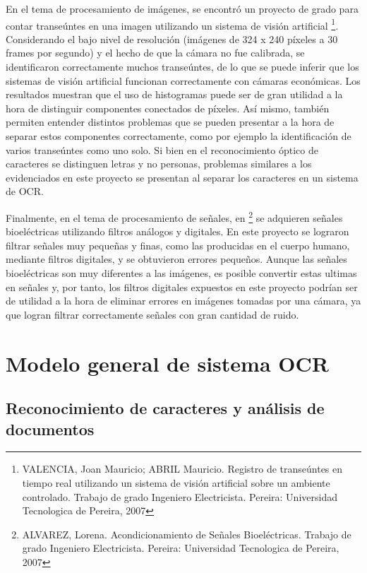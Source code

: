\documentclass[a4paper, 11pt, oneside]{report}
\begin{document}
En el tema de procesamiento de imágenes, se encontró un proyecto de grado para contar transeúntes en una imagen utilizando un sistema de visión artificial \footnote{VALENCIA, Joan Mauricio; ABRIL Mauricio. Registro de transeúntes en tiempo real utilizando un sistema de visión artificial sobre un ambiente controlado. Trabajo de grado Ingeniero Electricista. Pereira: Universidad Tecnologica de Pereira, 2007}. Considerando el bajo nivel de resolución (imágenes de 324 x 240 píxeles a 30 frames por segundo) y el hecho de que la cámara no fue calibrada, se identificaron correctamente muchos transeúntes, de lo que se puede inferir que los sistemas de visión artificial funcionan correctamente con cámaras económicas. Los resultados muestran que el uso de histogramas puede ser de gran utilidad a la hora de distinguir componentes conectados de píxeles. Así mismo, también permiten entender distintos problemas que se pueden presentar a la hora de separar estos componentes correctamente, como por ejemplo la identificación de varios transeúntes como uno solo. Si bien en el reconocimiento óptico de caracteres se distinguen letras y no personas, problemas similares a los evidenciados en este proyecto se presentan al separar los caracteres en un sistema de OCR.
	
Finalmente, en el tema de procesamiento de señales, en \footnote{ALVAREZ, Lorena. Acondicionamiento de Señales Bioeléctricas. Trabajo de grado Ingeniero Electricista. Pereira: Universidad Tecnologica de Pereira, 2007} se adquieren señales bioeléctricas utilizando filtros análogos y digitales. En este proyecto se lograron filtrar señales muy pequeñas y finas, como las producidas en el cuerpo humano, mediante filtros digitales, y se obtuvieron errores pequeños. Aunque las señales bioeléctricas son muy diferentes a las imágenes, es posible convertir estas ultimas en señales y, por tanto, los filtros digitales expuestos en este proyecto podrían ser de utilidad a la hora de eliminar errores en imágenes tomadas por una cámara, ya que logran filtrar correctamente señales con gran cantidad de ruido.\newline
    
\section {Modelo general de sistema OCR}

\subsection{Reconocimiento de caracteres y análisis de documentos}
\end{document}
